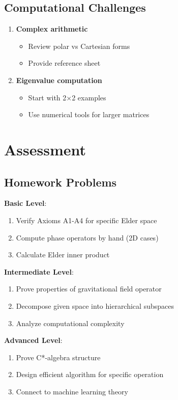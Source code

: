 \documentclass[12pt,a4paper]{article}
\begin{document}
\subsection{Computational Challenges}

\begin{enumerate}
    \item \textbf{Complex arithmetic}
    \begin{itemize}
        \item Review polar vs Cartesian forms
        \item Provide reference sheet
    \end{itemize}
    
    \item \textbf{Eigenvalue computation}
    \begin{itemize}
        \item Start with 2×2 examples
        \item Use numerical tools for larger matrices
    \end{itemize}
\end{enumerate}

\section{Assessment}

\subsection{Homework Problems}

\textbf{Basic Level}:
\begin{enumerate}
    \item Verify Axioms A1-A4 for specific Elder space
    \item Compute phase operators by hand (2D cases)
    \item Calculate Elder inner product
\end{enumerate}

\textbf{Intermediate Level}:
\begin{enumerate}
    \item Prove properties of gravitational field operator
    \item Decompose given space into hierarchical subspaces
    \item Analyze computational complexity
\end{enumerate}

\textbf{Advanced Level}:
\begin{enumerate}
    \item Prove C*-algebra structure
    \item Design efficient algorithm for specific operation
    \item Connect to machine learning theory
\end{enumerate}
\end{document}
